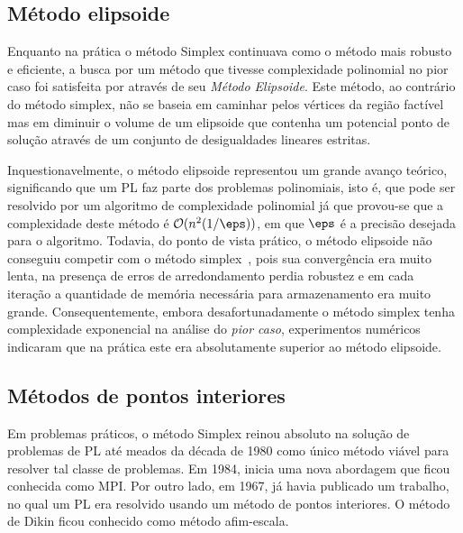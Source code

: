 \subsection{Método elipsoide}

Enquanto na prática o método Simplex continuava como o método mais robusto e
eficiente, a busca por um método que tivesse complexidade polinomial no pior
caso foi satisfeita por \textcite{Khachiyan:A-polynomial-algorithm:1979y} através
de seu  \emph{Método Elipsoide}.
Este método, ao contrário do método simplex,  não se baseia em caminhar pelos
vértices da região factível mas em diminuir o volume de um elipsoide que
contenha um potencial ponto de solução através de um conjunto de desigualdades
lineares estritas.

Inquestionavelmente, o método elipsoide representou um grande avanço teórico,
significando que um \ac{PL} faz parte dos problemas polinomiais, isto é, que
pode ser resolvido por um algoritmo de complexidade polinomial já que provou-se
que a complexidade deste método é  $\mathcal{O}(n^2(1/\eps))$, em
que $\eps$ é a precisão desejada para o algoritmo.
Todavia, do ponto de vista prático, o método elipsoide não conseguiu competir com o
método simplex~\cite{Bland:1981vn}, pois sua convergência era muito lenta, na
presença de erros de arredondamento perdia robustez e em cada iteração a
quantidade de memória necessária para armazenamento era muito grande.
Consequentemente, embora desafortunadamente o método simplex tenha complexidade
exponencial na análise do \emph{pior caso}, experimentos numéricos indicaram que
na prática este era absolutamente superior ao método elipsoide.


\subsection{Métodos de pontos interiores}



Em problemas práticos, o método Simplex reinou absoluto na solução de problemas
de \ac{PL} até meados da década de 1980 como único método viável para resolver
tal classe de problemas. Em 1984, \textcite{Karmarkar:1984cp} inicia uma nova
abordagem que ficou conhecida como 
\ac{MPI}. Por outro lado,  em 1967,
\textcite{DIKIN:InterativeSol1967} já havia publicado um trabalho, no qual um 
\ac{PL} era resolvido usando um método de pontos interiores. O método de Dikin ficou
conhecido como método afim-escala.
      



